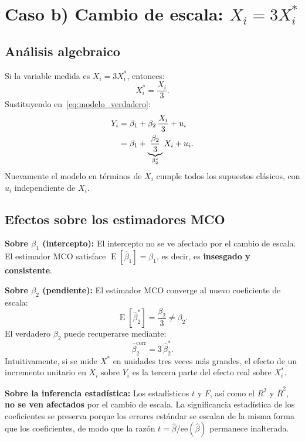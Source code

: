 \documentclass[12pt, letterpaper]{article}
\newcommand{\E}{\operatorname{E}}
\begin{document}
\section{Caso b) Cambio de escala: $X_i = 3X_i^*$}

\subsection{Análisis algebraico}

Si la variable medida es $X_i = 3X_i^*$, entonces:
\[
  X_i^* = \frac{X_i}{3}.
\]
Sustituyendo en~\eqref{eq:modelo_verdadero}:
\begin{align}
  Y_i &= \beta_1 + \beta_2\,\frac{X_i}{3} + u_i \notag\\
      &= \beta_1 + \underbrace{\frac{\beta_2}{3}}_{\beta_2^*} X_i + u_i.
  \label{eq:caso_b}
\end{align}
Nuevamente el modelo en términos de $X_i$ cumple todos los supuestos
clásicos, con $u_i$ independiente de $X_i$.

\subsection{Efectos sobre los estimadores MCO}

\textbf{Sobre $\beta_1$ (intercepto):} El intercepto no se ve afectado
por el cambio de escala. El estimador MCO satisface
$\E[\hat{\beta}_1] = \beta_1$, es decir, es \textbf{insesgado y consistente}.

\textbf{Sobre $\beta_2$ (pendiente):} El estimador MCO converge al nuevo
coeficiente de escala:
\[
  \E[\hat{\beta}_2^*] = \frac{\beta_2}{3} \neq \beta_2.
\]
El verdadero $\beta_2$ puede recuperarse mediante:
\[
  \hat{\beta}_2^{\text{corr}} = 3\,\hat{\beta}_2^*.
\]
Intuitivamente, si se mide $X^*$ en unidades tres veces más grandes, el
efecto de un incremento unitario en $X_i$ sobre $Y_i$ es la tercera parte
del efecto real sobre $X_i^*$.

\textbf{Sobre la inferencia estadística:} Los estadísticos $t$ y $F$, así
como el $R^2$ y $\bar{R}^2$, \textbf{no se ven afectados} por el cambio de
escala. La significancia estadística de los coeficientes se preserva porque
los errores estándar se escalan de la misma forma que los coeficientes,
de modo que la razón $t = \hat{\beta}/\text{ee}(\hat{\beta})$ permanece
inalterada.
\end{document}
